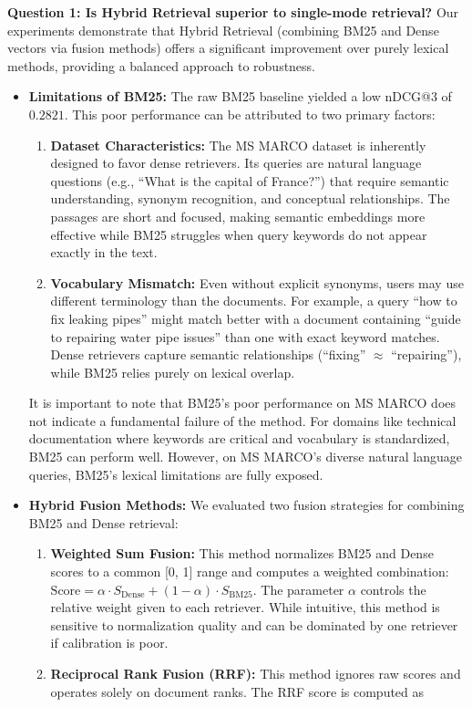 \textbf{Question 1: Is Hybrid Retrieval superior to single-mode retrieval?}
Our experiments demonstrate that Hybrid Retrieval (combining BM25 and Dense vectors via fusion methods) offers a significant improvement over purely lexical methods, providing a balanced approach to robustness.

\begin{itemize}
    \item \textbf{Limitations of BM25:} The raw BM25 baseline yielded a low nDCG@3 of $0.2821$. This poor performance can be attributed to two primary factors:
    \begin{enumerate}
        \item \textbf{Dataset Characteristics:} The MS MARCO dataset is inherently designed to favor dense retrievers. Its queries are natural language questions (e.g., ``What is the capital of France?'') that require semantic understanding, synonym recognition, and conceptual relationships. The passages are short and focused, making semantic embeddings more effective while BM25 struggles when query keywords do not appear exactly in the text.
        \item \textbf{Vocabulary Mismatch:} Even without explicit synonyms, users may use different terminology than the documents. For example, a query ``how to fix leaking pipes'' might match better with a document containing ``guide to repairing water pipe issues'' than one with exact keyword matches. Dense retrievers capture semantic relationships (``fixing'' $\approx$ ``repairing''), while BM25 relies purely on lexical overlap.
    \end{enumerate}
    It is important to note that BM25's poor performance on MS MARCO does not indicate a fundamental failure of the method. For domains like technical documentation where keywords are critical and vocabulary is standardized, BM25 can perform well. However, on MS MARCO's diverse natural language queries, BM25's lexical limitations are fully exposed.
    \item \textbf{Hybrid Fusion Methods:} We evaluated two fusion strategies for combining BM25 and Dense retrieval:
    \begin{enumerate}
        \item \textbf{Weighted Sum Fusion:} This method normalizes BM25 and Dense scores to a common [0, 1] range and computes a weighted combination: $\text{Score} = \alpha \cdot S_{\text{Dense}} + (1 - \alpha) \cdot S_{\text{BM25}}$. The parameter $\alpha$ controls the relative weight given to each retriever. While intuitive, this method is sensitive to normalization quality and can be dominated by one retriever if calibration is poor.
        \item \textbf{Reciprocal Rank Fusion (RRF):} This method ignores raw scores and operates solely on document ranks. The RRF score is computed as 
        

\end{enumerate}
\end{itemize}
